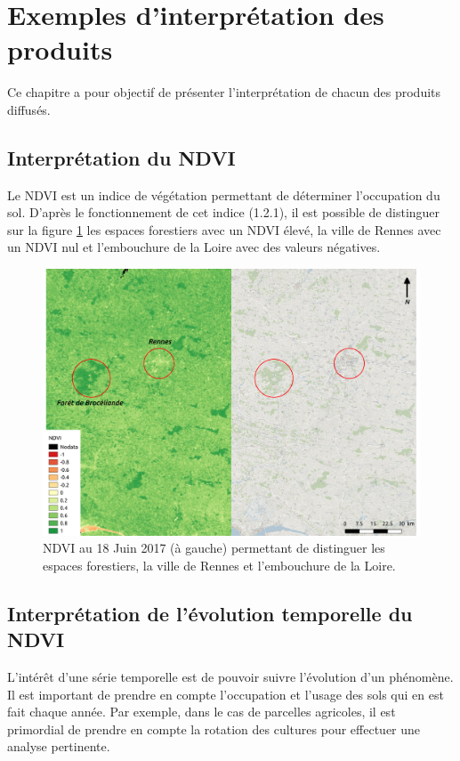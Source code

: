 \documentclass[10pt,a4paper]{article}
\begin{document}
\section{Exemples d'interprétation des produits}

Ce chapitre a pour objectif de présenter l'interprétation de chacun des produits diffusés.

\subsection{Interprétation du NDVI}

Le NDVI est un indice de végétation permettant de déterminer l'occupation du sol. D'après le fonctionnement de cet indice (1.2.1), il est possible de distinguer sur la figure \ref{NDVI1} les espaces forestiers avec un NDVI élevé, la ville de Rennes avec un NDVI nul et l'embouchure de la Loire avec des valeurs négatives.

\begin{figure}[!h]
\centering
\includegraphics[scale=0.33]{img/NDVI_interpretation1.pdf}
\caption{NDVI au 18 Juin 2017 (à gauche) permettant de distinguer les espaces forestiers, la ville de Rennes et l'embouchure de la Loire.}
\label{NDVI1}
\end{figure}

\subsection{Interprétation de l'évolution temporelle du NDVI}

L'intérêt d'une série temporelle est de pouvoir suivre l'évolution d'un phénomène. Il est important de prendre en compte l'occupation et l'usage des sols qui en est fait chaque année. Par exemple, dans le cas de parcelles agricoles, il est primordial de prendre en compte la rotation des cultures pour effectuer une analyse pertinente.\smallbreak
\end{document}
